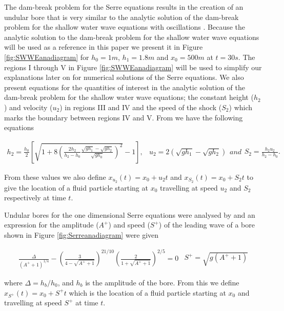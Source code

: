 \documentclass[SingleSpace,12pt,Proceedings]{Serre_ASCE}
\begin{document}
The dam-break problem for the Serre equations results in the creation of an undular bore that is very similar to the analytic solution of the dam-break problem for the shallow water wave equations with oscillations \cite{Hank-etal-2010-2034,Dutykh-2014-315}. Because the analytic solution to the dam-break problem for the shallow water wave equations will be used as a reference in this paper we present it in Figure \ref{fig:SWWEanadiagram} for $h_0 = 1m$, $h_1 =1.8m$ and $x_0 = 500m$ at $t=30s$. The regions I through V in Figure \ref{fig:SWWEanadiagram} will be used to simplify our explanations later on for numerical solutions of the Serre equations. We also present equations for the quantities of interest in the analytic solution of the dam-break problem for the shallow water wave equations; the constant height ($h_2$) and velocity ($u_2$) in regions III and IV and the speed of the shock ($S_2$) which marks the boundary between regions IV and V.  From  we have the following equations
\begin{linenomath*}
\begin{subequations}
\begin{gather}
h_2 = \frac{h_0}{2} \left[\sqrt{1 + 8 \left(\frac{2h_2}{h_2 - h_0}\frac{\sqrt{gh_1} - \sqrt{gh_2}}{\sqrt{gh_0}}\right)^2} - 1\right],
\end{gather}
	\begin{gather}
	u_2 = 2\left(\sqrt{gh_1} - \sqrt{gh_2}\right)
	\end{gather}
and
	\begin{gather}
	S_2 = \frac{h_2 u_2}{h_2 - h_0}.
	\end{gather}
\label{eq:WuSWWE}	
\end{subequations}
\end{linenomath*}
From these values we also define $x_{u_2}(t) = x_0 + u_2t$ and $x_{S_2}(t) = x_0 + S_2t$ to give the location of a fluid particle starting at $x_0$ travelling at speed $u_2$ and $S_2$ respectively at time $t$.

Undular bores for the one dimensional Serre equations were analysed by  and an expression for the amplitude ($A^+$) and speed ($S^+$) of the leading wave of a bore shown in Figure \ref{fig:Serreanadiagram} were given


\begin{linenomath*}
	\begin{subequations}
\begin{gather}
\frac{\Delta}{\left(A^+ + 1\right)^{1/4}} - \left(\frac{3}{4 -  \sqrt{A^+ + 1}}\right)^{21/10} \left(\frac{2}{1 + \sqrt{A^+ + 1}}\right)^{2/5} = 0
\label{eq:aplusdef}
\end{gather}
\begin{gather}
S^+ = \sqrt{g \left(A^+ + 1\right)}
\label{eq:splusdef}
\end{gather}
		\label{eq:ELWhitMod}	
	\end{subequations}
\end{linenomath*}
where $\Delta = h_b / h_0$, and $h_b$ is the amplitude of the bore. From this we define $x_{S^+}(t) = x_0 + S^+t$ which is the location of a fluid particle starting at $x_0$ and travelling at speed $S^+$ at time $t$.
\end{document}
